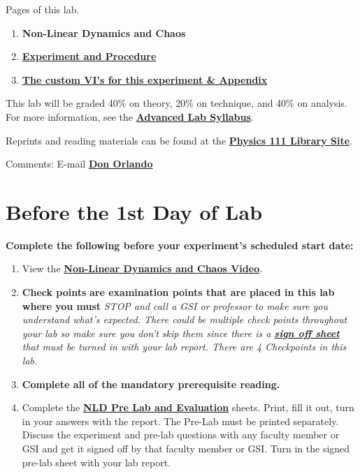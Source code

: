 \documentclass{../lab}
\begin{document}
Pages of this lab.

\begin{enumerate}
    \item \textbf{Non-Linear Dynamics and Chaos}

    \item \href{http://experimentationlab.berkeley.edu/node/102}{\textbf{Experiment and Procedure}}
    
    \item \href{http://experimentationlab.berkeley.edu/node/103}{\textbf{The custom VI's for this experiment \& Appendix}}
\end{enumerate}

This lab will be graded 40\% on theory, 20\% on technique, and 40\% on analysis. For more information, see the \href{\AdvancedLabSyllabus}{\textbf{Advanced Lab Syllabus}}.

Reprints and reading materials can be found at the \href{http://physics111.lib.berkeley.edu/Physics111/Reprints/NLD/NLD\_index.html}{\textbf{Physics 111 Library Site}}.

Comments: E-mail \href{\MailDonOrlando}{\textbf{Don Orlando}}

\section{Before the 1st Day of Lab}

\textbf{Complete the following before your experiment's scheduled start date:}

\begin{enumerate}
    \item View the \href{http://www.youtube.com/watch?v=Y0u3o9\_BRVQ}{\textbf{Non-Linear Dynamics and Chaos Video}}.

    \item \textbf{Check points} \textbf{are examination points that are placed in this lab where you must }\emph{STOP and call a GSI or professor to make sure you understand what's expected. There could  be multiple check points throughout your lab so make sure you don't skip them since there is a \href{http://experimentationlab.berkeley.edu/nldcheckpoints}{\textbf{sign off sheet}} that must be turned in with your lab report. There are 4 Checkpoints in this lab.}

    \item \textbf{Complete all of the mandatory prerequisite reading.}

    \item Complete the \href{http://experimentationlab.berkeley.edu/NLDPreLab}{\textbf{NLD Pre Lab and Evaluation}} sheets. Print, fill it out, turn in your answers with the report. The Pre-Lab must be printed separately. Discuss the experiment and pre-lab questions with any faculty member or GSI and get it signed off by that faculty member or GSI. Turn in the signed pre-lab sheet with your lab report.

\end{enumerate}
\end{document}
